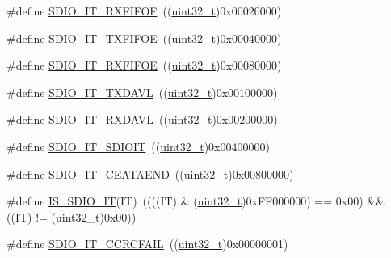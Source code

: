 \begin{DoxyCompactItemize}
\item 
\#define \hyperlink{group___s_d_i_o___interrupt__sources_gae60a1d8e5a7caff85d84e513b093b8a8}{S\+D\+I\+O\+\_\+\+I\+T\+\_\+\+R\+X\+F\+I\+F\+OF}~((\hyperlink{_p_e___types_8h_a33594304e786b158f3fb30289278f5af}{uint32\+\_\+t})0x00020000)
\item 
\#define \hyperlink{group___s_d_i_o___interrupt__sources_gabff1466c2f2effbe30b80a11c132d7c0}{S\+D\+I\+O\+\_\+\+I\+T\+\_\+\+T\+X\+F\+I\+F\+OE}~((\hyperlink{_p_e___types_8h_a33594304e786b158f3fb30289278f5af}{uint32\+\_\+t})0x00040000)
\item 
\#define \hyperlink{group___s_d_i_o___interrupt__sources_ga80b01aaf64c873d21bfa95e5d98d8766}{S\+D\+I\+O\+\_\+\+I\+T\+\_\+\+R\+X\+F\+I\+F\+OE}~((\hyperlink{_p_e___types_8h_a33594304e786b158f3fb30289278f5af}{uint32\+\_\+t})0x00080000)
\item 
\#define \hyperlink{group___s_d_i_o___interrupt__sources_gac8e5744e6d977182a6fc7484a6f1195e}{S\+D\+I\+O\+\_\+\+I\+T\+\_\+\+T\+X\+D\+A\+VL}~((\hyperlink{_p_e___types_8h_a33594304e786b158f3fb30289278f5af}{uint32\+\_\+t})0x00100000)
\item 
\#define \hyperlink{group___s_d_i_o___interrupt__sources_gaf236079642db95772334d1e9b9b27570}{S\+D\+I\+O\+\_\+\+I\+T\+\_\+\+R\+X\+D\+A\+VL}~((\hyperlink{_p_e___types_8h_a33594304e786b158f3fb30289278f5af}{uint32\+\_\+t})0x00200000)
\item 
\#define \hyperlink{group___s_d_i_o___interrupt__sources_gaf5d7559460a9ff1fccc82d815de25cb4}{S\+D\+I\+O\+\_\+\+I\+T\+\_\+\+S\+D\+I\+O\+IT}~((\hyperlink{_p_e___types_8h_a33594304e786b158f3fb30289278f5af}{uint32\+\_\+t})0x00400000)
\item 
\#define \hyperlink{group___s_d_i_o___interrupt__sources_gae045cd5ba681d2df8b1031b8f659139a}{S\+D\+I\+O\+\_\+\+I\+T\+\_\+\+C\+E\+A\+T\+A\+E\+ND}~((\hyperlink{_p_e___types_8h_a33594304e786b158f3fb30289278f5af}{uint32\+\_\+t})0x00800000)
\item 
\#define \hyperlink{group___s_d_i_o___interrupt__sources_ga0e413e92ec50bab73042e8965acc3e6c}{I\+S\+\_\+\+S\+D\+I\+O\+\_\+\+IT}(IT)~((((IT) \& (\hyperlink{_p_e___types_8h_a33594304e786b158f3fb30289278f5af}{uint32\+\_\+t})0x\+F\+F000000) == 0x00) \&\& ((\+I\+T) != (uint32\+\_\+t)0x00))
\item 
\#define \hyperlink{group___s_d_i_o___interrupt__sources_gabb076105e18355a260c40a379511e72f}{S\+D\+I\+O\+\_\+\+I\+T\+\_\+\+C\+C\+R\+C\+F\+A\+IL}~((\hyperlink{_p_e___types_8h_a33594304e786b158f3fb30289278f5af}{uint32\+\_\+t})0x00000001)
\item 

\end{DoxyCompactItemize}
